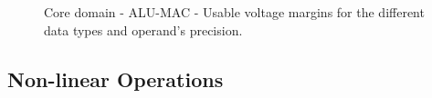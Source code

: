 
\begin{figure}[!htb]
    \centering
    \begin{subfigmatrix}{2}
      \label{fig:MAC_guardband}
    \end{subfigmatrix}
    \caption{Core domain - ALU-MAC - Usable voltage margins for the different data types and operand's precision.}
\end{figure}

\clearpage


\subsection{Non-linear Operations}

